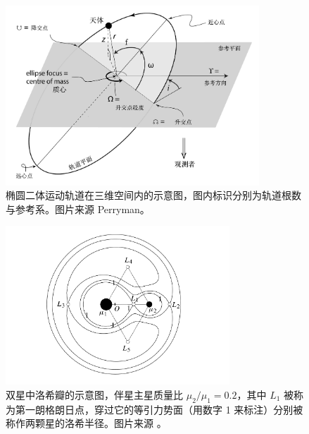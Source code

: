 \begin{figure}[t]
\centering
\includegraphics[width=0.85\textwidth]{figures/appendix/f2_3dorbit.pdf}
\caption{椭圆二体运动轨道在三维空间内的示意图，图内标识分别为轨道根数与参考系。图片来源 Perryman。}
\label{fig:3dorbit}
\end{figure}

\begin{figure}[hb!]
\centering
\includegraphics[width=0.75\textwidth]{figures/appendix/f3_rochelimit.pdf}
\caption[双星中洛希瓣的示意图，伴星主星质量比 $\mu_2/\mu_1 = 0.2$，其中 $L_1$ 被称为第一朗格朗日点，穿过它的等引力势面（用数字 1 来标注）分别被称作两颗星的洛希半径。图片版权 C. D. Murray，S. F. Dermott]{双星中洛希瓣的示意图，伴星主星质量比 $\mu_2/\mu_1 = 0.2$，其中 $L_1$ 被称为第一朗格朗日点，穿过它的等引力势面（用数字 1 来标注）分别被称作两颗星的洛希半径。图片来源 。}
\label{fig:rocher}
\end{figure}


